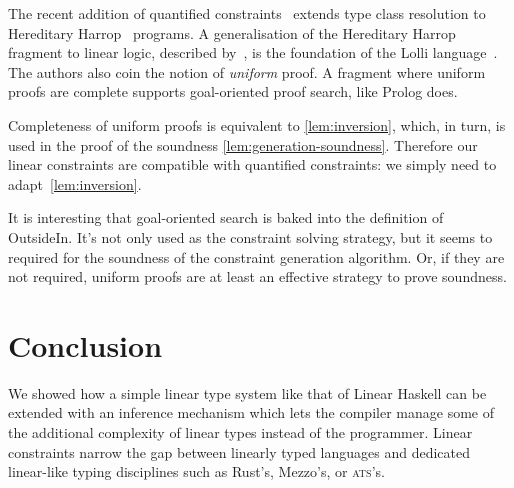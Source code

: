 \documentclass[acmsmall,usenames,dvipsnames,natbib=false,acmthm=false,screen]{acmart}
\theoremstyle{acmplain}
\theoremstyle{acmdefinition}
\begin{document}
The recent addition of quantified
constraints~\cite{quantified-constraints} extends type class
resolution to Hereditary Harrop~\cite{hereditary-harrop} programs. A generalisation of the
Hereditary Harrop fragment to linear logic, described by~\citet{hh-ll},
is the foundation of the Lolli language~\cite{hodas-thesis-lolli}.
The authors also coin the notion of \emph{uniform} proof. A fragment where
uniform proofs are complete supports goal-oriented proof search, like
Prolog does.

Completeness of uniform proofs is equivalent to
\cref{lem:inversion}, which, in turn, is used in the proof of the
soundness \cref{lem:generation-soundness}. Therefore our linear
constraints are compatible with quantified constraints: we simply need
to adapt~\cref{lem:inversion}.

It is interesting that goal-oriented search is baked into the
definition of OutsideIn. It's not only used as the constraint solving
strategy, but it seems to required for the soundness of the constraint
generation algorithm. Or, if they are not required, uniform proofs are
at least an effective strategy to prove soundness.



\section{Conclusion}
\label{sec:conclusion}

We showed how a simple linear type system like that of Linear
Haskell can be extended with an inference mechanism which lets the
compiler manage some of the additional complexity of linear types
instead of the programmer. Linear constraints narrow the gap between linearly
typed languages and dedicated linear-like typing disciplines such as Rust's,
Mezzo's, or \textsc{ats}'s.
\end{document}
